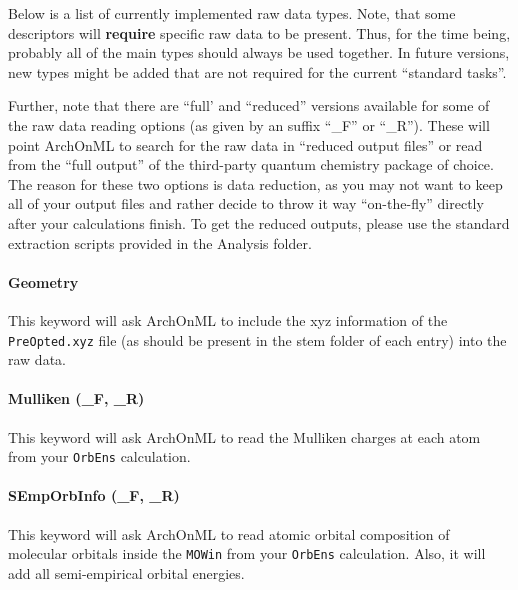\documentclass[12pt]{achemso}
\begin{document}
Below is a list of currently implemented raw data types. Note, that some descriptors will \textbf{require} specific raw data to be present. Thus, for the time being, probably all of the main types should always be used together. In future versions, new types might be added that are not required for the current ``standard tasks''.

Further, note that there are ``full' and ``reduced'' versions available for some of the raw data reading options (as given by an suffix ``\_F'' or ``\_R''). These will point ArchOnML to search for the raw data in ``reduced output files'' or read from the ``full output'' of the third-party quantum chemistry package of choice. The reason for these two options is data reduction, as you may not want to keep all of your output files and rather decide to throw it way ``on-the-fly'' directly after your calculations finish. To get the reduced outputs, please use the standard extraction scripts provided in the Analysis folder.

\paragraph{Geometry} This keyword will ask ArchOnML to include the xyz information of the \verb+PreOpted.xyz+ file (as should be present in the stem folder of each entry) into the raw data.

\paragraph{Mulliken (\_F, \_R)} This keyword will ask ArchOnML to read the Mulliken charges at each atom from your \verb+OrbEns+ calculation.

\paragraph{SEmpOrbInfo (\_F, \_R)} This keyword will ask ArchOnML to read atomic orbital composition of molecular orbitals inside the \verb+MOWin+ from your \verb+OrbEns+ calculation. Also, it will add all semi-empirical orbital energies.
\end{document}

